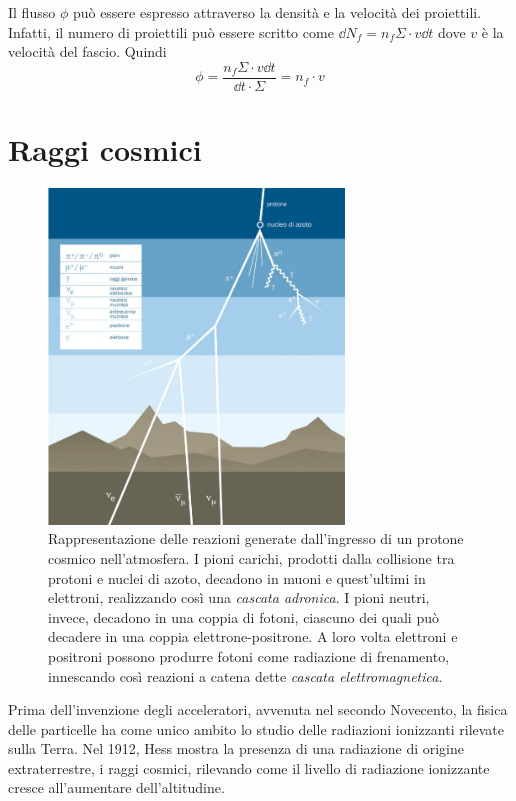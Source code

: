 \documentclass[../main.tex]{subfiles}
\begin{document}
Il flusso $\phi$ può essere espresso attraverso la densità e la velocità dei proiettili. Infatti, il numero di proiettili può essere scritto come $\dd N_f = n_f \Sigma \cdot v \dd t$ dove $v$ è la velocità del fascio. Quindi 
\begin{equation}
    \phi = \frac{n_f \Sigma \cdot v \dd t}{\dd t \cdot \Sigma} = n_f \cdot v
\end{equation}

\section{Raggi cosmici}

\begin{figure}[!b]
    \centering
    \includegraphics[width=0.7\textwidth]{cosmic.jpg}
    \caption{Rappresentazione delle reazioni generate dall'ingresso di un protone cosmico nell'atmosfera. I pioni carichi, prodotti dalla collisione tra protoni e nuclei di azoto, decadono in muoni e quest'ultimi in elettroni, realizzando così una \emph{cascata adronica}. I pioni neutri, invece, decadono in una coppia di fotoni, ciascuno dei quali può decadere in una coppia elettrone-positrone. A loro volta elettroni e positroni possono produrre fotoni come radiazione di frenamento, innescando così reazioni a catena dette \emph{cascata elettromagnetica}.
    \cite{as10_vdu}}
    \label{fig:cosmic}
\end{figure}

Prima dell'invenzione degli acceleratori, avvenuta nel secondo Novecento, la fisica delle particelle ha come unico ambito lo studio delle radiazioni ionizzanti rilevate sulla Terra.
Nel 1912, Hess mostra la presenza di una radiazione di origine extraterrestre, i raggi cosmici, rilevando come il livello di radiazione ionizzante cresce all'aumentare dell'altitudine.
\end{document}
